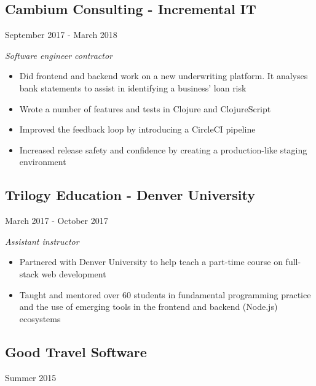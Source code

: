 \begin{minipage}[t]{0.6\textwidth}
  \subsection*{Cambium Consulting - Incremental IT}
\end{minipage}
\noindent\begin{minipage}[t]{0.4\textwidth}
  \flushright
  September 2017 - March 2018
\end{minipage}

\emph{Software engineer contractor}

\begin{itemize}
\item Did frontend and backend work on a new underwriting platform. It analyses
  bank statements to assist in identifying a business' loan risk
\item Wrote a number of features and tests in Clojure and ClojureScript
\item Improved the feedback loop by introducing a CircleCI pipeline
\item Increased release safety and confidence by creating a production-like
  staging environment
\end{itemize}

\noindent\begin{minipage}[t]{0.55\textwidth}
\subsection*{Trilogy Education - Denver University}
\end{minipage}
\noindent\begin{minipage}[t]{0.45\textwidth}
  \flushright
  March 2017 - October 2017
\end{minipage}

\emph{Assistant instructor}

\begin{itemize}
\item Partnered with Denver University to help teach a part-time course on
  full-stack web development
\item Taught and mentored over 60 students in fundamental programming practice
  and the use of emerging tools in the frontend and backend (Node.js)
  ecosystems
\end{itemize}

\noindent\begin{minipage}[t]{0.5\textwidth}
  \subsection*{Good Travel Software}
\end{minipage}
\noindent\begin{minipage}[t]{0.5\textwidth}
  \flushright
  Summer 2015
\end{minipage}

